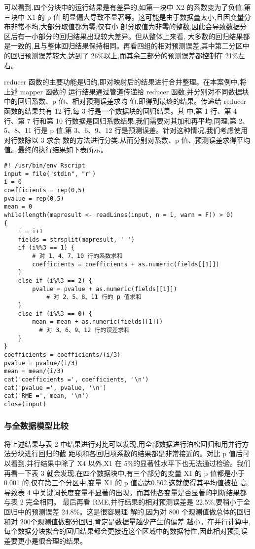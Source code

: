 可以看到,四个分块中的运行结果是有差异的,如第一块中 X2
的系数变为了负值,第三块中 X1 的 p 值
明显偏大导致不显著等。这可能是由于数据量太小,且因变量分布非常不均,大部分取值都为零,仅有小
部分取值为非零的整数,因此会导致数据分区后有一小部分的回归结果出现较大差异。但从整体上来看,
大多数的回归结果都是一致的,且与整体回归结果保持相同。再看四组的相对预测误差,其中第二分区中
的回归预测误差较大,达到了 26\%以上,而其余三部分的预测误差都控制在
21\%左右。

reducer
函数的主要功能是归约,即对映射后的结果进行合并整理。在本案例中,将上述
mapper 函数的 运行结果通过管道传递给 reducer
函数,并分别对不同数据块中的回归系数、p 值、相对预测误差求均
值,即得到最终的结果。传递给 reducer 函数的结果共有 12 行,每 3
行是一个数据块的回归结果。其 中,第 1 行、第 4 行、第 7 行和第 10
行数据是回归系数结果,我们需要对其加和再平均;同理,第 2、 5、8、11 行是 p
值,第 3、6、9、12 行是预测误差。针对这种情况,我们考虑使用对行数除以 3
求余 数的方法进行分类,从而分别对系数、p
值、预测误差求得平均值。最终的执行结果如下表所示。

\begin{lstlisting}
#! /usr/bin/env Rscript
input = file("stdin", "r")
i = 0
coefficients = rep(0,5)
pvalue = rep(0,5)
mean = 0
while(length(mapresult <- readLines(input, n = 1, warn = F)) > 0)
{
    i = i+1
    fields = strsplit(mapresult, ' ')
    if (i%%3 == 1) {
        # 对 1、4、7、10 行的系数求和
        coefficients = coefficients + as.numeric(fields[[1]])
    }
    else if (i%%3 == 2) {
        pvalue = pvalue + as.numeric(fields[[1]])
            # 对 2、5、8、11 行的 p 值求和
    }
    else if (i%%3 == 0) {
        mean = mean + as.numeric(fields[[1]])
          # 对 3、6、9、12 行的误差求和
    }
}
coefficients = coefficients/(i/3)
pvalue = pvalue/(i/3)
mean = mean/(i/3)
cat('coefficients =', coefficients, '\n')
cat('pvalue =', pvalue, '\n')
cat('RME =', mean, '\n')
close(input)
\end{lstlisting}

\subsubsection{与全数据模型比较}\label{ux4e0eux5168ux6570ux636eux6a21ux578bux6bd4ux8f83}

将上述结果与表 2
中结果进行对比可以发现,用全部数据进行泊松回归和用并行方法分块进行回归的截
距项和各回归项系数的结果都是非常接近的。对比 p
值后可以看到,并行结果中除了 X4 以外,X1 在
5\%的显著性水平下也无法通过检验。我们再看一下表 3
就会发现,在四个数据块中,有三个部分的变量 X1 的 p 值都是小于 0.001
的,仅在第三个分区中,变量 X1 的 p 值高达0.562,这就使得其平均值被拉
高,导致表 4
中关键词长度变量不显著的出现。而其他各变量是否显著的判断结果都与表 2
完全相同。 最后再看 RME,并行结果的相对预测误差是
22.5\%,要稍小于全回归中的预测误差 24.8\%。这是很容易理 解的,因为对 800
个观测值做总体的回归和对
200个观测值做部分回归,肯定是数据量越少产生的偏差
越小。在并行计算中,每个数据分块拟合的回归结果都会更接近这个区域中的数据特性,因此相对预测误
差要更小是很合理的结果。

